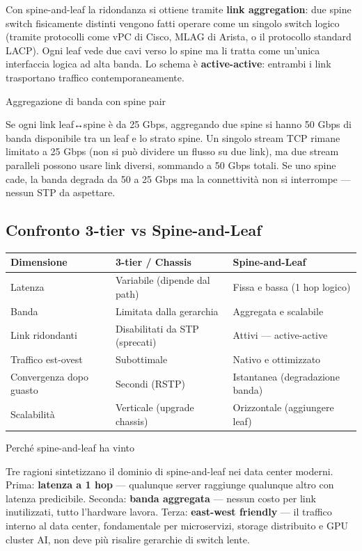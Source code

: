 \documentclass[
  italian,
  openany]{book}
\newcounter{none} %
\begin{document}
Con spine-and-leaf la ridondanza si ottiene tramite \textbf{link
aggregation}: due spine switch fisicamente distinti vengono fatti
operare come un singolo switch logico (tramite protocolli come vPC di
Cisco, MLAG di Arista, o il protocollo standard LACP). Ogni leaf vede
due cavi verso lo spine ma li tratta come un'unica interfaccia logica ad
alta banda. Lo schema è \textbf{active-active}: entrambi i link
trasportano traffico contemporaneamente.

\begin{callouttip}{Aggregazione di banda con spine pair}

Se ogni link leaf↔spine è da 25 Gbps, aggregando due spine si hanno 50
Gbps di banda disponibile tra un leaf e lo strato spine. Un singolo
stream TCP rimane limitato a 25 Gbps (non si può dividere un flusso su
due link), ma due stream paralleli possono usare link diversi, sommando
a 50 Gbps totali. Se uno spine cade, la banda degrada da 50 a 25 Gbps ma
la connettività non si interrompe --- nessun STP da aspettare.

\end{callouttip}

\subsection{Confronto 3-tier vs
Spine-and-Leaf}\label{confronto-3-tier-vs-spine-and-leaf}

{\def\LTcaptype{none} %
\begin{longtable}[]{@{}lll@{}}
\toprule\noalign{}
Dimensione & 3-tier / Chassis & Spine-and-Leaf \\
\midrule\noalign{}
\endhead
\bottomrule\noalign{}
\endlastfoot
Latenza & Variabile (dipende dal path) & Fissa e bassa (1 hop logico) \\
Banda & Limitata dalla gerarchia & Aggregata e scalabile \\
Link ridondanti & Disabilitati da STP (sprecati) & Attivi ---
active-active \\
Traffico est-ovest & Subottimale & Nativo e ottimizzato \\
Convergenza dopo guasto & Secondi (RSTP) & Istantanea (degradazione
banda) \\
Scalabilità & Verticale (upgrade chassis) & Orizzontale (aggiungere
leaf) \\
\end{longtable}
}

\begin{calloutnote}{Perché spine-and-leaf ha vinto}

Tre ragioni sintetizzano il dominio di spine-and-leaf nei data center
moderni. Prima: \textbf{latenza a 1 hop} --- qualunque server raggiunge
qualunque altro con latenza predicibile. Seconda: \textbf{banda
aggregata} --- nessun costo per link inutilizzati, tutto l'hardware
lavora. Terza: \textbf{east-west friendly} --- il traffico interno al
data center, fondamentale per microservizi, storage distribuito e GPU
cluster AI, non deve più risalire gerarchie di switch lente.

\end{calloutnote}
\end{document}
